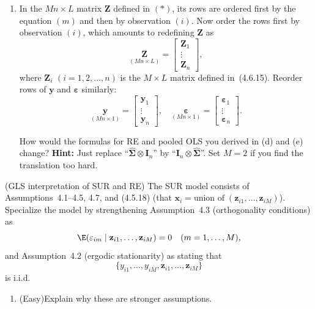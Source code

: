 \begin{problemset}
\begin{enumerate}[label=(\alph*)]
\item In the $Mn \times L$ matrix $\mathbf{Z}$ defined in $(*)$, its rows are ordered
first by the equation $(m)$ and then by observation $(i)$. Now order the rows
first by observation $(i)$, which amounts to redefining $\mathbf{Z}$ as
\[
\underset{(Mn \times L)}{\mathbf{Z}}
= \begin{bmatrix} \mathbf{Z}_1 \\ \vdots \\ \mathbf{Z}_n \end{bmatrix},
\]
where $\mathbf{Z}_i$ $(i = 1, 2, \ldots, n)$ is the $M \times L$ matrix defined
in~(4.6.15). Reorder rows of $\mathbf{y}$ and $\boldsymbol{\varepsilon}$ similarly:
\[
\underset{(Mn \times 1)}{\mathbf{y}}
= \begin{bmatrix} \mathbf{y}_1 \\ \vdots \\ \mathbf{y}_n \end{bmatrix}, \quad
\underset{(Mn \times 1)}{\boldsymbol{\varepsilon}}
= \begin{bmatrix} \boldsymbol{\varepsilon}_1 \\ \vdots \\ \boldsymbol{\varepsilon}_n \end{bmatrix}.
\]

How would the formulas for RE and pooled OLS you derived in (d) and (e) change?
\textbf{Hint:} Just replace ``$\widehat{\boldsymbol{\Sigma}} \otimes \mathbf{I}_n$''
by ``$\mathbf{I}_n \otimes \widehat{\boldsymbol{\Sigma}}$''.
Set $M = 2$ if you find the translation too hard.
\end{enumerate}

\exercise[3]
(GLS interpretation of SUR and RE)\quad
The SUR model consists of Assumptions~4.1--4.5, 4.7, and (4.5.18)
(that $\mathbf{x}_i = \text{union of}\; (\mathbf{z}_{i1}, \ldots, \mathbf{z}_{iM})$).
Specialize the model by strengthening Assumption~4.3 (orthogonality conditions) as
\[
\E(\varepsilon_{im} \mid \mathbf{z}_{i1}, \ldots, \mathbf{z}_{iM}) = 0
\quad (m = 1, \ldots, M),
\]
and Assumption~4.2 (ergodic stationarity) as stating that
\[
\{y_{i1}, \ldots, y_{iM}, \mathbf{z}_{i1}, \ldots, \mathbf{z}_{iM}\}
\]
is i.i.d.

\begin{enumerate}[label=(\alph*)]
\item (Easy)\quad Explain why these are stronger assumptions.


\end{enumerate}
\end{problemset}
